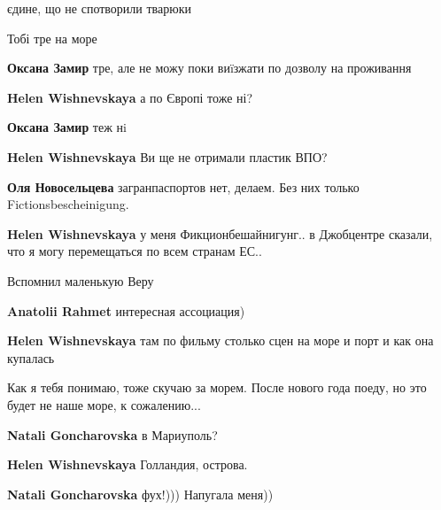  
 
 
 
 

\qqSecCmt


єдине, що не спотворили тварюки


Тобі тре на море

\begin{itemize} %
\textbf{Оксана Замир} тре, але не можу поки виïзжати по дозволу на проживання

\textbf{Helen Wishnevskaya} а по Європі тоже ні?

\textbf{Оксана Замир} теж нi

\textbf{Helen Wishnevskaya} Ви ще не отримали пластик ВПО?

\textbf{Оля Новосельцева} загранпаспортов нет, делаем. Без них только Fictionsbescheinigung.

\textbf{Helen Wishnevskaya} у меня Фикционбешайнигунг.. в Джобцентре сказали, что я могу перемещаться по всем странам ЕС..
\end{itemize} %


Вспомнил маленькую Веру

\begin{itemize} %
\textbf{Anatolii Rahmet} интересная ассоциация)

\textbf{Helen Wishnevskaya} там по фильму столько сцен на море и порт и как она купалась
\end{itemize} %


Как я тебя понимаю, тоже скучаю за морем. После нового года поеду, но это будет
не наше море, к сожалению...

\begin{itemize} %
\textbf{Natali Goncharovska} в Мариуполь?

\textbf{Helen Wishnevskaya} Голландия, острова.

\textbf{Natali Goncharovska} фух!))) Напугала меня))
\end{itemize} %

